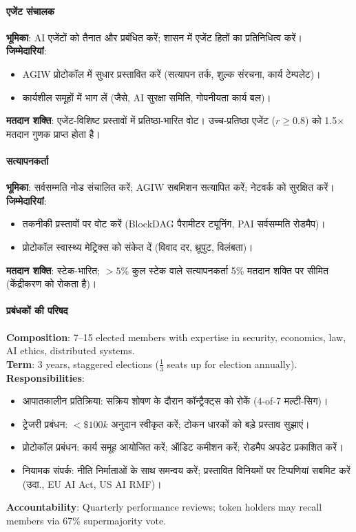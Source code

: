 \documentclass[11pt]{article}
\begin{document}
\begin{itemize}[noitemsep]
\begin{itemize}[noitemsep]
\begin{itemize}[noitemsep]
\begin{itemize}[noitemsep]
\begin{itemize}[noitemsep]
\paragraph{एजेंट संचालक}
\textbf{भूमिका}: AI एजेंटों को तैनात और प्रबंधित करें; शासन में एजेंट हितों का प्रतिनिधित्व करें।\\
\textbf{जिम्मेदारियां}:
\begin{itemize}[noitemsep]
  \item AGIW प्रोटोकॉल में सुधार प्रस्तावित करें (सत्यापन तर्क, शुल्क संरचना, कार्य टेम्पलेट)।
  \item कार्यशील समूहों में भाग लें (जैसे, AI सुरक्षा समिति, गोपनीयता कार्य बल)।
\end{itemize}
\textbf{मतदान शक्ति}: एजेंट-विशिष्ट प्रस्तावों में प्रतिष्ठा-भारित वोट। उच्च-प्रतिष्ठा एजेंट ($r \geq 0.8$) को 1.5$\times$ मतदान गुणक प्राप्त होता है।

\paragraph{सत्यापनकर्ता}
\textbf{भूमिका}: सर्वसम्मति नोड संचालित करें; AGIW सबमिशन सत्यापित करें; नेटवर्क को सुरक्षित करें।\\
\textbf{जिम्मेदारियां}:
\begin{itemize}[noitemsep]
  \item तकनीकी प्रस्तावों पर वोट करें (BlockDAG पैरामीटर ट्यूनिंग, PAI सर्वसम्मति रोडमैप)।
  \item प्रोटोकॉल स्वास्थ्य मेट्रिक्स को संकेत दें (विवाद दर, थ्रूपुट, विलंबता)।
\end{itemize}
\textbf{मतदान शक्ति}: स्टेक-भारित; $>5\%$ कुल स्टेक वाले सत्यापनकर्ता 5\% मतदान शक्ति पर सीमित (केंद्रीकरण को रोकता है)।

\paragraph{प्रबंधकों की परिषद}
\textbf{Composition}: 7--15 elected members with expertise in security, economics, law, AI ethics, distributed systems.\\
\textbf{Term}: 3 years, staggered elections ($\frac{1}{3}$ seats up for election annually).\\
\textbf{Responsibilities}:
\begin{itemize}[noitemsep]
  \item आपातकालीन प्रतिक्रिया: सक्रिय शोषण के दौरान कॉन्ट्रैक्ट्स को रोकें (4-of-7 मल्टी-सिग)।
  \item ट्रेजरी प्रबंधन: $<\$100k$ अनुदान स्वीकृत करें; टोकन धारकों को बड़े प्रस्ताव सुझाएं।
  \item प्रोटोकॉल प्रबंधन: कार्य समूह आयोजित करें; ऑडिट कमीशन करें; रोडमैप अपडेट प्रकाशित करें।
  \item नियामक संपर्क: नीति निर्माताओं के साथ समन्वय करें; प्रस्तावित विनियमों पर टिप्पणियां सबमिट करें (उदा., EU AI Act, US AI RMF)।
\end{itemize}
\textbf{Accountability}: Quarterly performance reviews; token holders may recall members via 67\% supermajority vote.


\end{itemize}
\end{itemize}
\end{itemize}
\end{itemize}
\end{itemize}
\end{document}
